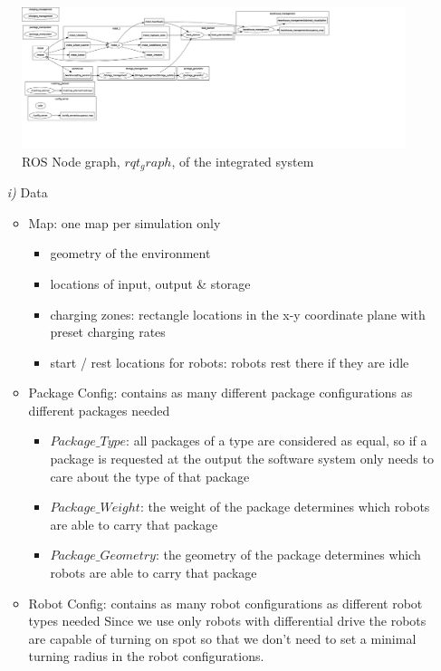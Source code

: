 \documentclass{article}
\begin{document}
\begin{figure}
	\centering
	\includegraphics[scale=0.25,natwidth=4214,natheight=1555]{rosgraph}
	\caption{ROS Node graph, $rqt_graph$, of the integrated system}
	\label{rqt}
\end{figure}

\begin{enumerate}
  \item[\textit{i)}] Data 
  \begin{itemize}
    \item Map: one map per simulation only
    \begin{itemize}
      \item geometry of the environment
      \item locations of input, output \& storage
      \item charging zones: rectangle locations in the x-y coordinate plane with preset charging rates
      \item start / rest locations for robots: robots rest there if they are idle
    \end{itemize}
    \item Package Config: contains as many different package configurations as different packages needed
    \begin{itemize}
      \item $Package\_Type$: all packages of a type are considered as equal, so if a package is requested at the output the software system only needs to care about the type of that package
      \item $Package\_Weight$: the weight of the package determines which robots are able to carry that package
      \item $Package\_Geometry$: the geometry of the package determines which robots are able to carry that package
	\end{itemize}
	\item  Robot Config: contains as many robot configurations as different robot types needed
	Since we use only robots with differential drive the robots are capable of turning on spot so that we don't need to set a minimal turning radius in the robot configurations.

\end{itemize}
\end{enumerate}
\end{document}
